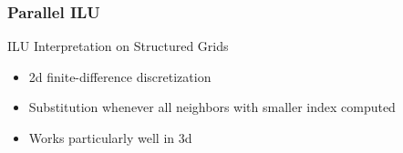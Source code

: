 \begin{frame}[fragile]
\frametitle{Parallel ILU}

     \begin{block}{ILU Interpretation on Structured Grids}
      \begin{itemize}
        \item 2d finite-difference discretization
        \item Substitution whenever all neighbors with smaller index computed
        \item Works particularly well in 3d
      \end{itemize}

      \begin{center}
%

\end{center}
\end{block}
\end{frame}

